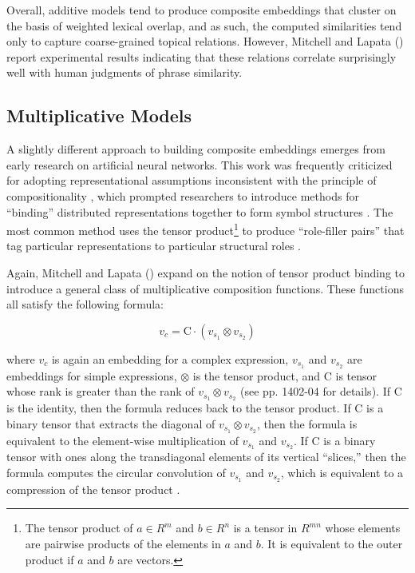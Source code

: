 Overall, additive models tend to produce composite embeddings that cluster on the basis of weighted lexical overlap, and as such, the computed similarities tend only to capture coarse-grained topical relations. However, Mitchell and Lapata (\citeyear{Mitchell:2010}) report experimental results indicating that these relations correlate surprisingly well with human judgments of phrase similarity.  

\subsection{Multiplicative Models}

A slightly different approach to building composite embeddings emerges from early research on artificial neural networks. This work was frequently criticized for adopting representational assumptions inconsistent with the principle of compositionality \citep[see e.g.,][]{FodorPylyshyn:1988}, which prompted researchers to introduce methods for ``binding'' distributed representations together to form symbol structures \citep{Smolensky:1990,Plate:1995,Gayler:2004}. The most common method uses the tensor product\footnote{The tensor product of $ a \in R^m $ and $ b \in R^n $ is a tensor in $ R^{mn} $ whose elements are pairwise products of the elements in $a$ and $b$. It is equivalent to the outer product if $a$ and $b$ are vectors.} to produce ``role-filler pairs'' that tag particular representations to particular structural roles \citep{SmolenskyLegendre:2006}.

Again, Mitchell and Lapata (\citeyear{Mitchell:2010}) expand on the notion of tensor product binding to introduce a general class of multiplicative composition functions. These functions all satisfy the following formula: 

\begin{equation}
v_{c} = \textrm{C} \cdot (v_{s_1} \otimes  v_{s_2})
\end{equation}

\noindent
where $ v_{c} $ is again an embedding for a complex expression, $ v_{s_1} $ and $ v_{s_2} $ are embeddings for simple expressions, $ \otimes $ is the tensor product, and $ \textrm{C} $ is tensor whose rank is greater than the rank of $ v_{s_1} \otimes v_{s_2} $ (see pp. 1402-04 for details). If $ \textrm{C} $ is the identity, then the formula reduces back to the tensor product. If $ \textrm{C} $ is a binary tensor that extracts the diagonal of $ v_{s_1} \otimes  v_{s_2} $, then the formula is equivalent to the element-wise multiplication of $ v_{s_1} $ and $ v_{s_2} $. If $ \textrm{C} $ is a binary tensor with ones along the transdiagonal elements of its vertical ``slices,'' then the formula computes the circular convolution of $ v_{s_1} $ and $ v_{s_2} $, which is equivalent to a compression of the tensor product \citep{Plate:2003,Mitchell:2010}. 

